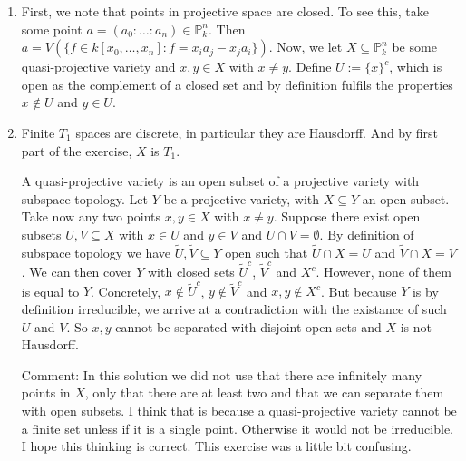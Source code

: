 \begin{exercise}{4}
    \begin{enumerate}
        \item{} First, we note that points in projective space are closed. To see
            this, take some point $a=(a_0 : \dots : a_n)\in \mathbb{P}^n_k$. Then
            $a=V(\lbrace f\in k[x_0, \dots, x_n]: f=x_ia_j-x_ja_i \rbrace).$ Now, we
            let $X\subseteq \mathbb{P}^n_k$ be some quasi-projective variety and
            $x,y\in X$ with $x\neq y$. Define $U:=\lbrace x \rbrace^c$, which is
            open as the complement of a closed set and by definition fulfils the
            properties $x \not\in U$ and $y \in U$.
        \item{Finite $T_1$ spaces are discrete, in particular they are
            Hausdorff. And by first part of the exercise, $X$ is $T_1$.

            A quasi-projective variety is an open subset of a projective variety
            with subspace topology. Let $Y$ be a projective variety, with $X
            \subseteq Y$ an open subset. Take now any two points $x, y \in X$
            with $x \not= y$. Suppose there exist open subsets $U, V \subseteq
            X$ with $x \in U$ and $y \in V$ and $U \cap V = \emptyset$. By
            definition of subspace topology we have $\tilde{U}, \tilde{V}
            \subseteq Y$ open such that $\tilde{U} \cap X = U$ and $\tilde{V}
            \cap X = V$. We can then cover $Y$ with closed sets $\tilde{U}^c$,
            $\tilde{V}^c$ and $X^c$. However, none of them is equal to $Y$.
            Concretely, $x \notin \tilde{U}^c$, $y \notin \tilde{V}^c$ and $x, y
            \notin X^c$. But because $Y$ is by definition irreducible, we arrive
            at a contradiction with the existance of such $U$ and $V$. So $x, y$
            cannot be separated with disjoint open sets and $X$ is not Hausdorff.

            Comment:
            In this solution we did not use that there are infinitely many
            points in $X$, only that there are at least two and that we can
            separate them with open subsets. I think that is because a
            quasi-projective variety cannot be a finite set unless if it is a
            single point. Otherwise it would not be irreducible.
            I hope this thinking is correct. This exercise was a little bit
            confusing.
            }
     \end{enumerate}
\end{exercise}

